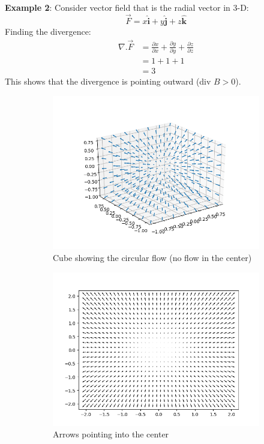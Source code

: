 \documentclass[10pt,a4paper]{article}
\begin{document}
\textbf{Example 2}: Consider vector field that is the radial vector in 3-D:
$$
    \overrightarrow{F} = x\hat{\textbf{i}}+y\hat{\textbf{j}}+z\hat{\textbf{k}}
$$
Finding the divergence:
\begin{align*}
    \nabla.\overrightarrow{F} &= \frac{\partial x}{\partial x} + \frac{\partial y}{\partial y} + \frac{\partial z}{\partial z} \\
    &= 1 + 1 + 1 \\
    &= 3
\end{align*}
This shows that the divergence is pointing outward (div $B > 0$).
\begin{figure} [h!]
    \centering
    \begin{subfigure}{.5\textwidth}
      \centering
      \includegraphics[scale=0.3]{Radial_out.png}
      \caption{Cube showing the circular flow (no flow in the center)}
      \label{fig:sub1}
    \end{subfigure}%
    \begin{subfigure}{.5\textwidth}
      \centering
      \includegraphics[scale=0.3]{2D_out.png}
      \caption{Arrows pointing into the center}
      \label{fig:sub2}
    \end{subfigure}
    \caption*{}
    \label{fig:test}
\end{figure}
\end{document}
